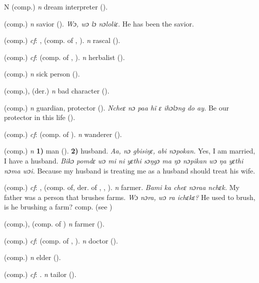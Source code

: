 \begin{letter}{N}
 (comp.) \textit{n} dream interpreter (\citealt{Pichl1967}).

 (comp.) \textit{n} savior (\citealt{Pichl1967}). \textit{Wɔ, wɔ lɔ nɔloliɛ.} He has been the savior.

 (comp.) \textit{cf}: ,  (comp. of , ). \textit{n} rascal (\citealt{Pichl1967}).

 (comp.) \textit{cf}:  (comp. of , ). \textit{n} herbalist (\citealt{Pichl1967}).

 (comp.) \textit{n} sick person (\citealt{Pichl1967}).

 (comp.), (der.) \textit{n} bad character (\citealt{Pichl1967}).

 (comp.) \textit{n} guardian, protector (\citealt{Pichl1967}). \textit{Ncheɛ nɔ paa hĩ ɛ ihɔlɔng do ay.} Be our protector in this life (\citealt{Pichl1967}). 

 (comp.) \textit{cf}:  (comp. of ). \textit{n} wanderer (\citealt{Pichl1967}).

 (comp.) \textit{n} \textbf{1)} man (\citealt{Pichl1967}). \textbf{2)} husband. \textit{Aa, nɔ gbisiŋɛ, abi nɔpokan.} Yes, I am married, I have a husband. \textit{Bikɔ pomdɛ wɔ mi ni yɛthi sɔŋgɔ ma ŋɔ nɔpikan wɔ ŋa yɛthi nɔma wɔi.} Because my husband is treating me as a husband should treat his wife.

 (comp.) \textit{cf}: ,  (comp. of, der. of , , ). \textit{n} farmer. \textit{Bami ka cheɛ nɔraa nchɛk.} My father was a person that brushes farms. \textit{Wɔ nɔra, wɔ ra ichɛkɛ?} He used to brush, is he brushing a farm? comp.  (see ) 

 (comp.), (comp. of ) \textit{n} farmer (\citealt{Pichl1967}).

 (comp.) \textit{cf}:  (comp. of , ). \textit{n} doctor (\citealt{Pichl1967}).

 (comp.) \textit{n} elder (\citealt{Pichl1967}).

 (comp.) \textit{cf}: . \textit{n} tailor (\citealt{Pichl1967}).


\end{letter}
